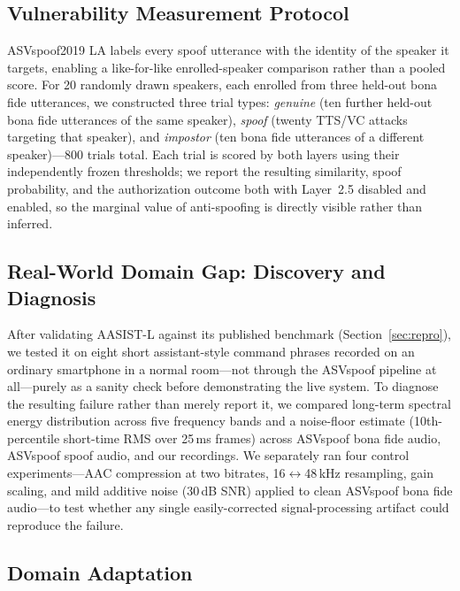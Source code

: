 \documentclass[conference]{IEEEtran}
\begin{document}
\subsection{Vulnerability Measurement Protocol}

ASVspoof2019 LA labels every spoof utterance with the identity of the speaker
it targets, enabling a like-for-like enrolled-speaker comparison rather than a
pooled score. For 20 randomly drawn speakers, each enrolled from three held-out
bona fide utterances, we constructed three trial types: \textit{genuine} (ten
further held-out bona fide utterances of the same speaker), \textit{spoof}
(twenty TTS/VC attacks targeting that speaker), and \textit{impostor} (ten bona
fide utterances of a different speaker)---800 trials total. Each trial is
scored by both layers using their independently frozen thresholds; we report
the resulting similarity, spoof probability, and the authorization outcome both
with Layer~2.5 disabled and enabled, so the marginal value of anti-spoofing is
directly visible rather than inferred.

\subsection{Real-World Domain Gap: Discovery and Diagnosis}

After validating AASIST-L against its published benchmark
(Section~\ref{sec:repro}), we tested it on eight short assistant-style command
phrases recorded on an ordinary smartphone in a normal room---not through the
ASVspoof pipeline at all---purely as a sanity check before demonstrating the
live system. To diagnose the resulting failure rather than merely report it, we
compared long-term spectral energy distribution across five frequency bands and
a noise-floor estimate (10th-percentile short-time RMS over 25\,ms frames)
across ASVspoof bona fide audio, ASVspoof spoof audio, and our recordings. We
separately ran four control experiments---AAC compression at two bitrates,
16$\leftrightarrow$48\,kHz resampling, gain scaling, and mild additive noise
(30\,dB SNR) applied to clean ASVspoof bona fide audio---to test whether any
single easily-corrected signal-processing artifact could reproduce the failure.

\subsection{Domain Adaptation}
\end{document}

